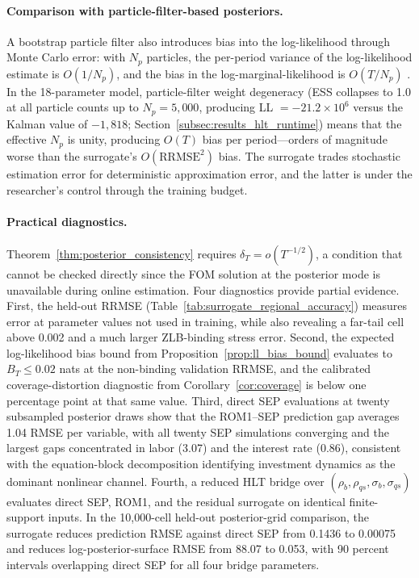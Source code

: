 \documentclass[12pt]{article}
\theoremstyle{plain}
\theoremstyle{definition}
\theoremstyle{remark}
\begin{document}
\paragraph{Comparison with particle-filter-based posteriors.}
A bootstrap particle filter also introduces bias into the log-likelihood through Monte Carlo error: with $N_p$ particles, the per-period variance of the log-likelihood estimate is $O(1/N_p)$, and the bias in the log-marginal-likelihood is $O(T/N_p)$ \citep{pitt2012some,doucet2015efficient}. In the 18-parameter model, particle-filter weight degeneracy (ESS collapses to 1.0 at all particle counts up to $N_p = 5{,}000$, producing LL $= -21.2 \times 10^6$ versus the Kalman value of $-1{,}818$; Section~\ref{subsec:results_hlt_runtime}) means that the effective $N_p$ is unity, producing $O(T)$ bias per period---orders of magnitude worse than the surrogate's $O(\text{RRMSE}^2)$ bias. The surrogate trades stochastic estimation error for deterministic approximation error, and the latter is under the researcher's control through the training budget.

\paragraph{Practical diagnostics.}
Theorem~\ref{thm:posterior_consistency} requires $\delta_T = o(T^{-1/2})$, a condition that cannot be checked directly since the FOM solution at the posterior mode is unavailable during online estimation. Four diagnostics provide partial evidence. First, the held-out RRMSE (Table~\ref{tab:surrogate_regional_accuracy}) measures error at parameter values not used in training, while also revealing a far-tail cell above 0.002 and a much larger ZLB-binding stress error. Second, the expected log-likelihood bias bound from Proposition~\ref{prop:ll_bias_bound} evaluates to $B_T \leq 0.02$ nats at the non-binding validation RRMSE, and the calibrated coverage-distortion diagnostic from Corollary~\ref{cor:coverage} is below one percentage point at that same value. Third, direct SEP evaluations at twenty subsampled posterior draws show that the ROM1--SEP prediction gap averages 1.04 RMSE per variable, with all twenty SEP simulations converging and the largest gaps concentrated in labor (3.07) and the interest rate (0.86), consistent with the equation-block decomposition identifying investment dynamics as the dominant nonlinear channel. Fourth, a reduced HLT bridge over $(\rho_b,\rho_{qs},\sigma_b,\sigma_{qs})$ evaluates direct SEP, ROM1, and the residual surrogate on identical finite-support inputs. In the 10{,}000-cell held-out posterior-grid comparison, the surrogate reduces prediction RMSE against direct SEP from 0.1436 to 0.00075 and reduces log-posterior-surface RMSE from 88.07 to 0.053, with 90 percent intervals overlapping direct SEP for all four bridge parameters.
\end{document}
